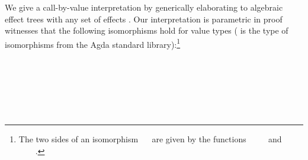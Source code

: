 We give a call-by-value interpretation  by generically elaborating to algebraic effect trees with any set of effects .
Our interpretation is parametric in proof witnesses that the following isomorphisms hold for value types ( is the type of isomorphisms from the Agda standard library):\footnote{The two sides of an isomorphism ~~ are given by the functions ~\as{:}~~~ and ~\as{:}~~~.}
\begin{code}[hide]%
%
\>[4]\AgdaSpace{}%
\AgdaModule{\AgdaUnderscore{}}%
\>[307I]\AgdaSpace{}%
\AgdaSpace{}%
\AgdaSymbol{:}\AgdaSpace{}%
\AgdaSpace{}%
\<%
\\
\>[.][@{}l@{}]\<[307I]%
\>[13]\AgdaSpace{}%
%
\>[313I]\AgdaSymbol{:}\AgdaSpace{}%
\AgdaSymbol{\{}\AgdaSpace{}%
\AgdaSpace{}%
\AgdaSymbol{:}\AgdaSpace{}%
\AgdaSymbol{\}}\<%
\\
\>[.][@{}l@{}]\<[313I]%
\>[20]\AgdaSpace{}%
\AgdaSpace{}%
\AgdaSpace{}%
\AgdaSpace{}%
\AgdaSpace{}%
\AgdaSpace{}%
\AgdaSpace{}%
\AgdaSymbol{(}\AgdaSpace{}%
\AgdaSpace{}%
\AgdaSpace{}%
\AgdaSpace{}%
\AgdaSpace{}%
\AgdaSpace{}%
\AgdaSpace{}%
\AgdaSpace{}%
\AgdaSymbol{)}\AgdaSpace{}%
\<%
\\
%
\>[13]\AgdaSpace{}%
%
\>[335I]\AgdaSymbol{:}\AgdaSpace{}%
\AgdaSymbol{\{}\AgdaSpace{}%
\AgdaSymbol{:}\AgdaSpace{}%
\AgdaSymbol{\}}\<%
\\
\>[.][@{}l@{}]\<[335I]%
\>[20]\AgdaSpace{}%
\AgdaSpace{}%
\AgdaSpace{}%
\AgdaSpace{}%
\AgdaSpace{}%
\AgdaSpace{}%
\AgdaSpace{}%
\AgdaSpace{}%
%
\>[41]\AgdaSpace{}%
\<%
\\
\>[4][@{}l@{\AgdaIndent{0}}]%
\>[6]\AgdaSpace{}%
\AgdaSpace{}%
\AgdaSpace{}%
\AgdaSymbol{(}\AgdaSymbol{;}\AgdaSpace{}%

\end{code}
